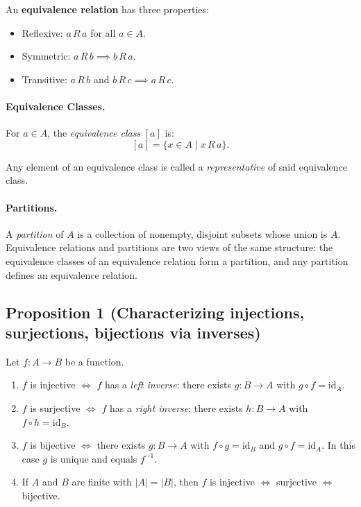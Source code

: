 \documentclass[12pt]{article}
\theoremstyle{definition}
\begin{document}
An \textbf{equivalence relation} has three properties:
\begin{itemize}
    \item Reflexive: \(a \,R\, a\) for all \(a \in A\).
    \item Symmetric: \(a \,R\, b \implies b \,R\, a\).
    \item Transitive: \(a \,R\, b\) and \(b \,R\, c \implies a \,R\, c\).
\end{itemize}

\paragraph{Equivalence Classes.}  
For \(a \in A\), the \emph{equivalence class} \([a]\) is:
\[
[a] = \{ x \in A \mid x \,R\, a \}.
\]

\vspace{1pt}

\noindent
Any element of an equivalence class is called a \textit{representative} of said equivalence class.

\vspace{1pt}

\paragraph{Partitions.}  
A \emph{partition} of \(A\) is a collection of nonempty, disjoint subsets whose union is \(A\).  
Equivalence relations and partitions are two views of the same structure: the equivalence classes of an equivalence relation form a partition, and any partition defines an equivalence relation.

\newpage

\subsection*{Proposition 1 (Characterizing injections, surjections, bijections via inverses)}

\vspace{1em}

Let \( f : A \to B \) be a function.

\vspace{1em}

\begin{enumerate}
    \item \(f\) is injective \(\Longleftrightarrow\) \(f\) has a \emph{left inverse}: there exists \(g : B \to A\) with \(g \circ f = \mathrm{id}_A\).
    \item \(f\) is surjective \(\Longleftrightarrow\) \(f\) has a \emph{right inverse}: there exists \(h : B \to A\) with \(f \circ h = \mathrm{id}_B\).
    \item \(f\) is bijective \(\Longleftrightarrow\) there exists \(g : B \to A\) with
          \(f \circ g = \mathrm{id}_B\) and \(g \circ f = \mathrm{id}_A\).
          In this case \(g\) is unique and equals \(f^{-1}\).
    \item If \(A\) and \(B\) are finite with \(|A|=|B|\), then \(f\) is injective \(\Longleftrightarrow\) surjective \(\Longleftrightarrow\) bijective.
\end{enumerate}
\end{document}
